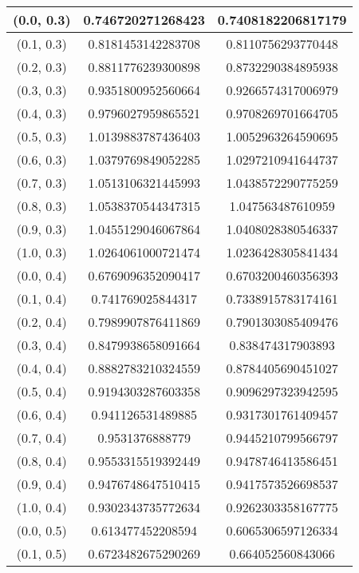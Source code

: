 \begin{table}[H]
\begin{tabular}{|c|c|c|}
\hline
(0.0, 0.3) & 0.746720271268423 & 0.7408182206817179 \\
\hline
(0.1, 0.3) & 0.8181453142283708 & 0.8110756293770448 \\
\hline
(0.2, 0.3) & 0.8811776239300898 & 0.8732290384895938 \\
\hline
(0.3, 0.3) & 0.9351800952560664 & 0.9266574317006979 \\
\hline
(0.4, 0.3) & 0.9796027959865521 & 0.9708269701664705 \\
\hline
(0.5, 0.3) & 1.0139883787436403 & 1.0052963264590695 \\
\hline
(0.6, 0.3) & 1.0379769849052285 & 1.0297210941644737 \\
\hline
(0.7, 0.3) & 1.0513106321445993 & 1.0438572290775259 \\
\hline
(0.8, 0.3) & 1.0538370544347315 & 1.047563487610959 \\
\hline
(0.9, 0.3) & 1.0455129046067864 & 1.0408028380546337 \\
\hline
(1.0, 0.3) & 1.0264061000721474 & 1.0236428305841434 \\
\hline
\hline
(0.0, 0.4) & 0.6769096352090417 & 0.6703200460356393 \\
\hline
(0.1, 0.4) & 0.741769025844317 & 0.7338915783174161 \\
\hline
(0.2, 0.4) & 0.7989907876411869 & 0.7901303085409476 \\
\hline
(0.3, 0.4) & 0.8479938658091664 & 0.838474317903893 \\
\hline
(0.4, 0.4) & 0.8882783210324559 & 0.8784405690451027 \\
\hline
(0.5, 0.4) & 0.9194303287603358 & 0.9096297323942595 \\
\hline
(0.6, 0.4) & 0.941126531489885 & 0.9317301761409457 \\
\hline
(0.7, 0.4) & 0.9531376888779 & 0.9445210799566797 \\
\hline
(0.8, 0.4) & 0.9553315519392449 & 0.9478746413586451 \\
\hline
(0.9, 0.4) & 0.9476748647510415 & 0.9417573526698537 \\
\hline
(1.0, 0.4) & 0.9302343735772634 & 0.9262303358167775 \\
\hline
\hline
(0.0, 0.5) & 0.613477452208594 & 0.6065306597126334 \\
\hline
(0.1, 0.5) & 0.6723482675290269 & 0.664052560843066 \\
\hline

\end{tabular}
\end{table}
